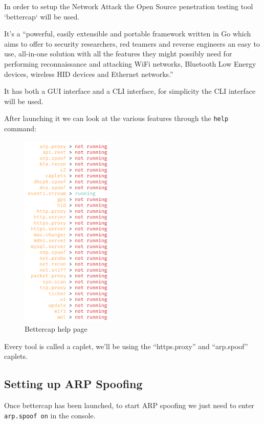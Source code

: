 \documentclass[status=normal,cover=tesi,language=en]{gmeepd}
\begin{document}
In order to setup the Network Attack the Open Source penetration testing tool `bettercap` will be used.

It's a ``powerful, easily extensible and portable framework written in Go which aims to offer to security researchers, red teamers and reverse engineers an easy to use, all-in-one solution with all the features they might possibly need for performing reconnaissance and attacking WiFi networks, Bluetooth Low Energy devices, wireless HID devices and Ethernet networks.''\cite{bettercap}

It has both a GUI interface and a CLI interface, for simplicity the CLI interface will be used.

After launching it we can look at the various features through the \verb|help| command:

\begin{figure}[h!]
 \centering
 \includegraphics[width=4.5cm]{img/bettercap_help.png}
 \caption{Bettercap help page}
 \label{fig: bettercap help}
\end{figure}

Every tool is called a caplet, we'll be using the ``https.proxy'' and ``arp.spoof'' caplets.

\pagebreak

\subsection{Setting up ARP Spoofing}

Once bettercap has been launched, to start ARP spoofing we just need to enter \verb|arp.spoof on| in the console.
\end{document}
